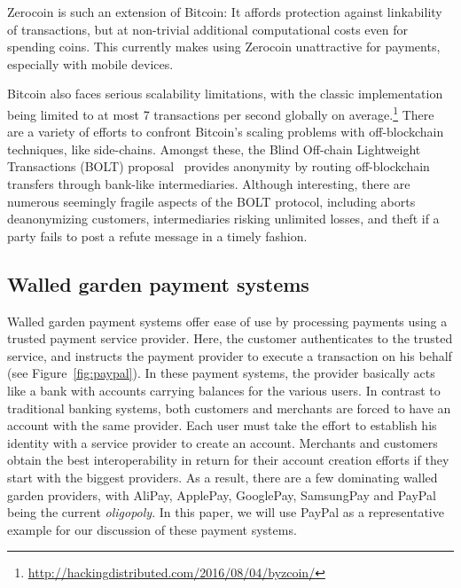 \documentclass{llncs}
\begin{document}
Zerocoin \cite{miers2013zerocoin} is such an extension of Bitcoin:
It affords protection against linkability of transactions,
but at non-trivial additional computational costs even for
spending coins.  This currently makes using Zerocoin unattractive
for payments, especially with mobile devices.

Bitcoin also faces serious scalability limitations, with the classic
implementation being limited to at most 7 transactions per second
globally on
average.\footnote{\url{http://hackingdistributed.com/2016/08/04/byzcoin/}}
There are a variety of efforts to confront Bitcoin's scaling problems
with off-blockchain techniques, like side-chains. %
Amongst these, the Blind Off-chain Lightweight Transactions (BOLT)
proposal~\cite{BOLT} provides anonymity by routing off-blockchain
transfers through bank-like intermediaries.  Although interesting,
there are numerous seemingly fragile aspects of the BOLT protocol,
including aborts deanonymizing customers, intermediaries risking
unlimited losses, and theft if a party fails to post a refute message
in a timely fashion.




\subsection{Walled garden payment systems}

Walled garden payment systems offer ease of use by processing payments
using a trusted payment service provider. Here, the customer
authenticates to the trusted service, and instructs the payment
provider to execute a transaction on his behalf
(see Figure~\ref{fig:paypal}).  In these payment systems, the provider
basically acts like a bank with accounts carrying balances for the
various users.  In contrast to traditional banking systems, both
customers and merchants are forced to have an account with the same
provider.  Each user must take the effort to establish his identity
with a service provider to create an account.  Merchants and customers
obtain the best interoperability in return for their account creation
efforts if they start with the biggest providers.  As a result, there
are a few dominating walled garden providers, with AliPay, ApplePay,
GooglePay, SamsungPay and PayPal being the current {\em oligopoly}.  In this
paper, we will use PayPal as a representative example for our discussion
of these payment systems.
\end{document}
